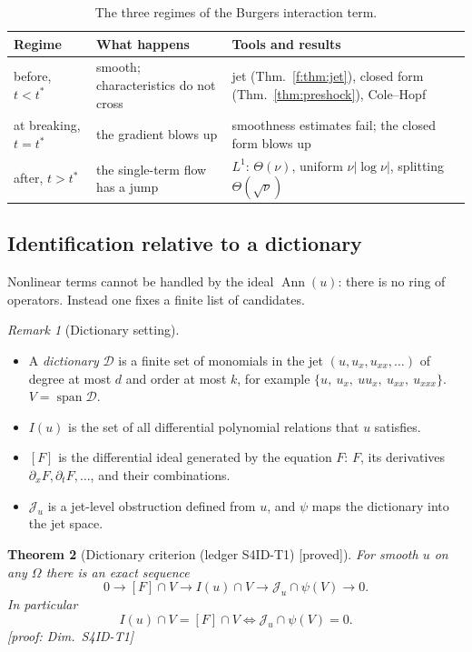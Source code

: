 \documentclass[11pt]{article}
\theoremstyle{plain}
\newtheorem{theorem}{Theorem}[section]
\theoremstyle{definition}
\theoremstyle{remark}
\newtheorem{remark}[theorem]{Remark}
\DeclareMathOperator{\Ann}{Ann}             %
\DeclareMathOperator{\spn}{span}
\newcommand{\badge}[2]{\textcolor{#1}{\textsf{\footnotesize[#2]}}}
\newcommand{\proved}[1][]{\badge{cC}{proved#1}}
\newcommand{\led}[1]{\textcolor{cG}{\textsf{\footnotesize(ledger #1)}}}
\newenvironment{notebox}[1]{\begin{remark}[#1]}{\end{remark}}
\newcommand{\dimref}[1]{\textsf{\footnotesize[proof: Dim.~#1]}}
\begin{document}
\begin{table}[!htb]
\centering\small
\begin{tabular}{@{}L{3.0cm}L{4.8cm}L{6.4cm}@{}}
\toprule
Regime & What happens & Tools and results\\\midrule
before, $t<t^*$ & smooth; characteristics do not cross & jet (Thm.~\ref{f:thm:jet}), closed form (Thm.~\ref{thm:preshock}), Cole--Hopf\\
at breaking, $t=t^*$ & the gradient blows up & smoothness estimates fail; the closed form blows up\\
after, $t>t^*$ & the single-term flow has a jump & $L^1$: $\Theta(\nu)$, uniform $\nu|\log\nu|$, splitting $\Theta(\sqrt\nu)$\\
\bottomrule
\end{tabular}
\caption{The three regimes of the Burgers interaction term.}\label{f:tab:regimes}
\end{table}

\subsection{Identification relative to a dictionary}

Nonlinear terms cannot be handled by the ideal $\Ann(u)$: there is no ring of operators. Instead one fixes a finite list of candidates.

\begin{notebox}{Dictionary setting}
\begin{itemize}
\item A \emph{dictionary} $\mathcal D$ is a finite set of monomials in the jet $(u,u_x,u_{xx},\dots)$ of degree at most $d$ and order at most $k$, for example $\{u,\ u_x,\ uu_x,\ u_{xx},\ u_{xxx}\}$. $V=\spn\mathcal D$.
\item $I(u)$ is the set of all differential polynomial relations that $u$ satisfies.
\item $[F]$ is the differential ideal generated by the equation $F$: $F$, its derivatives $\partial_xF,\partial_tF,\dots$, and their combinations.
\item $\mathcal J_u$ is a jet-level obstruction defined from $u$, and $\psi$ maps the dictionary into the jet space.
\end{itemize}
\end{notebox}

\begin{theorem}[{Dictionary criterion \led{S4ID-T1} \proved}]\label{f:thm:dict}
For smooth $u$ on any $\Omega$ there is an exact sequence
\[
0\to[F]\cap V\to I(u)\cap V\to\mathcal J_u\cap\psi(V)\to0 .
\]
In particular
\[
I(u)\cap V=[F]\cap V\iff\mathcal J_u\cap\psi(V)=0 .
\]
\dimref{S4ID-T1}
\end{theorem}
\end{document}
